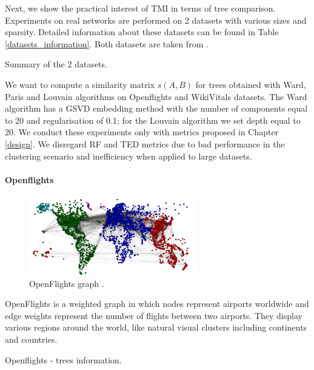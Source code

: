 Next, we show the practical interest of TMI in terms of tree comparison. Experiments on real networks are performed on 2 datasets with various sizes and sparsity. Detailed information about these datasets can be found in Table \ref{datasets_information}. Both datasets are taken from \cite{netset}.

\begin{table}[H]
	\centering
	\caption{Summary of the 2 datasets.}
	\label{openflights_trees_information}
	\label{datasets_information}  
\end{table}

We want to compute a similarity matrix $s(A, B)$ for trees obtained with Ward, Paris and Louvain algorithms on Openflights and WikiVitals datasets. The Ward algorithm has a GSVD embedding method with the number of components equal to 20 and regularisation of 0.1; for the Louvain algorithm we set depth equal to 20. We conduct these experiments only with metrics proposed in Chapter \ref{design}. We disregard RF and TED metrics due to bad performance in the clustering scenario and inefficiency when applied to large datasets.  

\paragraph{Openflights}

\begin{figure}[h]
	\caption{OpenFlights graph \cite{netset}.  \label{fig:openflights_graph}}
	\includegraphics[width=0.65\textwidth,keepaspectratio=true]{figures/openflights_visualization.png}
	\centering
\end{figure}

OpenFlights is a weighted graph in which nodes represent airports worldwide and edge weights represent the number of flights between two airports. They display various regions around the world, like natural visual clusters including continents and countries. 

\begin{table}[h]
	\centering
	\caption{Openflights - trees information. \label{openflight_trees_information}}
	    
\end{table}

